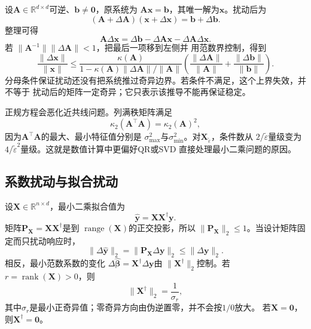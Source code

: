 设$\bm{A}\in\mathbb{R}^{d\times d}$可逆、$\bm{b}\neq\bm{0}$，原系统为
$\bm{A}\bm{x}=\bm{b}$，其唯一解为$\bm{x}$。扰动后为
\[
  (\bm{A}+\Delta\bm{A})(\bm{x}+\Delta\bm{x})
  =\bm{b}+\Delta\bm{b}.
\]
整理可得
\[
  \bm{A}\Delta\bm{x}
  =\Delta\bm{b}-\Delta\bm{A}\bm{x}-\Delta\bm{A}\Delta\bm{x}.
\]
若
$\lVert\bm{A}^{-1}\rVert\lVert\Delta\bm{A}\rVert<1$，把最后一项移到左侧并
用范数界控制，得到
\begin{equation}
  \frac{\lVert\Delta\bm{x}\rVert}{\lVert\bm{x}\rVert}
  \leq
  \frac{\kappa(\bm{A})}
       {1-\kappa(\bm{A})
       \lVert\Delta\bm{A}\rVert/\lVert\bm{A}\rVert}
  \left(
    \frac{\lVert\Delta\bm{A}\rVert}{\lVert\bm{A}\rVert}
    +
    \frac{\lVert\Delta\bm{b}\rVert}{\lVert\bm{b}\rVert}
  \right).
  \label{eq:matrix-analysis-linear-system-perturbation}
\end{equation}
分母条件保证扰动还没有把系统推过奇异边界。若条件不满足，这个上界失效，并不等于
扰动后的矩阵一定奇异；它只表示该推导不能再保证稳定。

正规方程会恶化近共线问题。列满秩矩阵满足
\begin{equation}
  \kappa_2(\bm{A}^{\top}\bm{A})=\kappa_2(\bm{A})^2,
  \label{eq:matrix-analysis-normal-equation-condition-square}
\end{equation}
因为$\bm{A}^{\top}\bm{A}$的最大、最小特征值分别是
$\sigma_{\max}^2$与$\sigma_{\min}^2$。对$\bm{X}_{\widetilde{\varepsilon}}$，条件数从
$2/\widetilde{\varepsilon}$量级变为$4/\widetilde{\varepsilon}^2$量级。这就是数值计算中更偏好QR或SVD
直接处理最小二乘问题的原因。

\subsection{系数扰动与拟合扰动}

设$\bm{X}\in\mathbb{R}^{n\times d}$，最小二乘拟合值为
\[
  \widehat{\bm{y}}=\bm{X}\bm{X}^{\dagger}\bm{y}.
\]
矩阵$\bm{P}_{\bm{X}}=\bm{X}\bm{X}^{\dagger}$是到
$\operatorname{range}(\bm{X})$的正交投影，所以
$\lVert\bm{P}_{\bm{X}}\rVert_2\leq1$。当设计矩阵固定而只扰动响应时，
\[
  \lVert\Delta\widehat{\bm{y}}\rVert_2
  =\lVert\bm{P}_{\bm{X}}\Delta\bm{y}\rVert_2
  \leq
  \lVert\Delta\bm{y}\rVert_2.
\]
相反，最小范数系数的变化
$\Delta\widehat{\bm{\beta}}=\bm{X}^{\dagger}\Delta\bm{y}$由
$\lVert\bm{X}^{\dagger}\rVert_2$控制。若
$r=\operatorname{rank}(\bm{X})>0$，则
\[
  \lVert\bm{X}^{\dagger}\rVert_2=\frac{1}{\sigma_r},
\]
其中$\sigma_r$是最小正奇异值；零奇异方向由伪逆置零，并不会按$1/0$放大。
若$\bm{X}=\bm{0}$，则$\bm{X}^{\dagger}=\bm{0}$。

